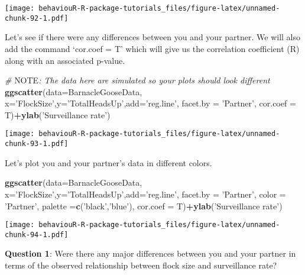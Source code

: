 \documentclass[]{book}
\newenvironment{Shaded}{\begin{snugshade}}{\end{snugshade}}
\newcommand{\AlertTok}[1]{\textcolor[rgb]{0.94,0.16,0.16}{#1}}
\newcommand{\CommentTok}[1]{\textcolor[rgb]{0.56,0.35,0.01}{\textit{#1}}}
\newcommand{\DataTypeTok}[1]{\textcolor[rgb]{0.13,0.29,0.53}{#1}}
\newcommand{\KeywordTok}[1]{\textcolor[rgb]{0.13,0.29,0.53}{\textbf{#1}}}
\newcommand{\NormalTok}[1]{#1}
\newcommand{\OperatorTok}[1]{\textcolor[rgb]{0.81,0.36,0.00}{\textbf{#1}}}
\newcommand{\StringTok}[1]{\textcolor[rgb]{0.31,0.60,0.02}{#1}}
\begin{document}
\texttt{[image: behaviouR-R-package-tutorials\_files/figure-latex/unnamed-chunk-92-1.pdf]}

Let's see if there were any differences between you and your partner. We will also add the command `cor.coef = T' which will give us the correlation coefficient (R) along with an associated p-value.

\begin{Shaded}
\begin{Highlighting}[]
\CommentTok{# }\AlertTok{NOTE}\CommentTok{: The data here are simulated so your plots should look different}
\KeywordTok{ggscatter}\NormalTok{(}\DataTypeTok{data=}\NormalTok{BarnacleGooseData,}
          \DataTypeTok{x=}\StringTok{'FlockSize'}\NormalTok{,}\DataTypeTok{y=}\StringTok{'TotalHeadsUp'}\NormalTok{,}\DataTypeTok{add=}\StringTok{'reg.line'}\NormalTok{, }\DataTypeTok{facet.by =} \StringTok{'Partner'}\NormalTok{,}
          \DataTypeTok{cor.coef =}\NormalTok{ T)}\OperatorTok{+}\KeywordTok{ylab}\NormalTok{(}\StringTok{'Surveillance rate'}\NormalTok{)}
\end{Highlighting}
\end{Shaded}

\texttt{[image: behaviouR-R-package-tutorials\_files/figure-latex/unnamed-chunk-93-1.pdf]}

Let's plot you and your partner's data in different colors.

\begin{Shaded}
\begin{Highlighting}[]
\KeywordTok{ggscatter}\NormalTok{(}\DataTypeTok{data=}\NormalTok{BarnacleGooseData,}
          \DataTypeTok{x=}\StringTok{'FlockSize'}\NormalTok{,}\DataTypeTok{y=}\StringTok{'TotalHeadsUp'}\NormalTok{,}\DataTypeTok{add=}\StringTok{'reg.line'}\NormalTok{, }\DataTypeTok{facet.by =} \StringTok{'Partner'}\NormalTok{,}
          \DataTypeTok{color =} \StringTok{'Partner'}\NormalTok{, }\DataTypeTok{palette =}\KeywordTok{c}\NormalTok{(}\StringTok{'black'}\NormalTok{,}\StringTok{'blue'}\NormalTok{),}
          \DataTypeTok{cor.coef =}\NormalTok{ T)}\OperatorTok{+}\KeywordTok{ylab}\NormalTok{(}\StringTok{'Surveillance rate'}\NormalTok{)}
\end{Highlighting}
\end{Shaded}

\texttt{[image: behaviouR-R-package-tutorials\_files/figure-latex/unnamed-chunk-94-1.pdf]}

\textbf{Question 1}: Were there any major differences between you and your partner in terms of the observed relationship between flock size and surveillance rate?
\end{document}
